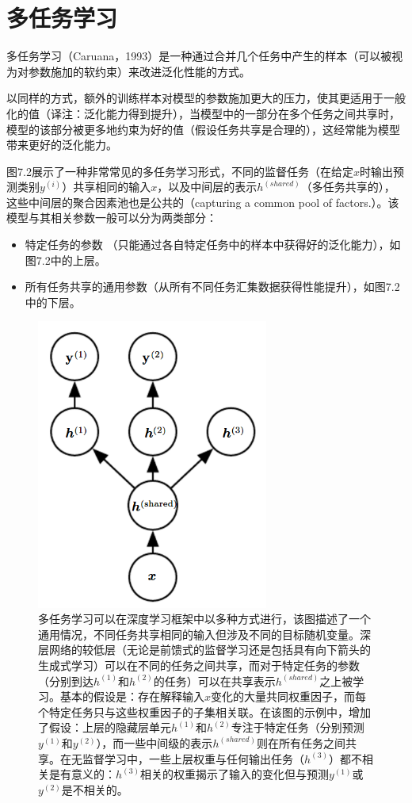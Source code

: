 \section{多任务学习}

多任务学习（Caruana，1993）是一种通过合并几个任务中产生的样本（可以被视为对参数施加的软约束）来改进泛化性能的方式。

以同样的方式，额外的训练样本对模型的参数施加更大的压力，使其更适用于一般化的值（译注：泛化能力得到提升），当模型中的一部分在多个任务之间共享时，模型的该部分被更多地约束为好的值（假设任务共享是合理的），这经常能为模型带来更好的泛化能力。

图7.2展示了一种非常常见的多任务学习形式，不同的监督任务（在给定$x$时输出预测类别$y^{(i)}$）共享相同的输入$x$，以及中间层的表示$h^{(shared)}$（多任务共享的），这些中间层的聚合因素池也是公共的（capturing a common pool of factors.）。该模型与其相关参数一般可以分为两类部分：

\begin{itemize}
\item 特定任务的参数 （只能通过各自特定任务中的样本中获得好的泛化能力），如图7.2中的上层。
\item 所有任务共享的通用参数（从所有不同任务汇集数据获得性能提升），如图7.2中的下层。
\end{itemize}

\begin{figure}[htbp] %
   \centering
   \includegraphics[width=3in]{fig/chap7/7_2.png} 
   \caption{多任务学习可以在深度学习框架中以多种方式进行，该图描述了一个通用情况，不同任务共享相同的输入但涉及不同的目标随机变量。深层网络的较低层（无论是前馈式的监督学习还是包括具有向下箭头的生成式学习）可以在不同的任务之间共享，而对于特定任务的参数（分别到达$h^{(1)}$和$h^{(2)}$的任务）可以在共享表示$h^{(shared)}$之上被学习。基本的假设是：存在解释输入$x$变化的大量共同权重因子，而每个特定任务只与这些权重因子的子集相关联。在该图的示例中，增加了假设：上层的隐藏层单元$h^{(1)}$和$h^{(2)}$专注于特定任务（分别预测$y^{(1)}$和$y^{(2)}$），而一些中间级的表示$h^{(shared)}$则在所有任务之间共享。在无监督学习中，一些上层权重与任何输出任务（$h^{(3)}$）都不相关是有意义的：$h^{(3)}$相关的权重揭示了输入的变化但与预测$y^{(1)}$或$y^{(2)}$是不相关的。}
   \label{fig:7_2}
\end{figure}

